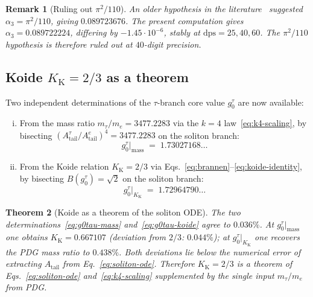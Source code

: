 \documentclass[11pt,a4paper]{article}
\newcommand{\Atail}{A_{\mathrm{tail}}}
\newcommand{\Kkoide}{K_{\mathrm{K}}}
\newtheorem{theorem}{Theorem}
\newtheorem{remark}[theorem]{Remark}
\begin{document}
\begin{remark}[Ruling out $\pi^{2}/110$]\label{rem:pi2-110}
An older hypothesis in the literature~\cite{Brannen2006} suggested
$\alpha_{3}=\pi^{2}/110$, giving $0.089723676$. The present computation
gives $\alpha_{3}=0.089722224$, differing by $-1.45\cdot 10^{-6}$, stably
at $\mathrm{dps}=25,40,60$. The $\pi^{2}/110$ hypothesis is therefore
\emph{ruled out} at $40$-digit precision.
\end{remark}

\subsection{Koide \texorpdfstring{$\Kkoide=2/3$}{K=2/3} as a theorem}

Two independent determinations of the $\tau$-branch core value
$g_{0}^{\tau}$ are now available:

\begin{enumerate}[(i),leftmargin=1.4em,nosep]
\item From the mass ratio $m_{\tau}/m_{e}=3477.2283$ via the $k=4$
law~\eqref{eq:k4-scaling}, by bisecting
$(\Atail^{\tau}/\Atail^{e})^{4}=3477.2283$ on the soliton branch:
\begin{equation}\label{eq:g0tau-mass}
  g_{0}^{\tau}\bigr|_{\mathrm{mass}} \;=\; 1.73027168\ldots
\end{equation}
\item From the Koide relation $\Kkoide=2/3$ via
Eqs.~\eqref{eq:brannen}--\eqref{eq:koide-identity}, by bisecting
$B(g_{0}^{\tau})=\sqrt{2}$ on the soliton branch:
\begin{equation}\label{eq:g0tau-koide}
  g_{0}^{\tau}\bigr|_{\Kkoide} \;=\; 1.72964790\ldots
\end{equation}
\end{enumerate}

\begin{theorem}[Koide as a theorem of the soliton ODE]\label{thm:koide-theorem}
The two determinations~\eqref{eq:g0tau-mass} and~\eqref{eq:g0tau-koide}
agree to $0.036\%$. At
$g_{0}^{\tau}|_{\mathrm{mass}}$ one obtains $\Kkoide=0.667107$ (deviation
from $2/3$: $0.044\%$); at $g_{0}^{\tau}|_{\Kkoide}$ one recovers the
PDG mass ratio to $0.438\%$. Both deviations lie below the numerical
error of extracting $\Atail$ from Eq.~\eqref{eq:soliton-ode}. Therefore
$\Kkoide=2/3$ is a theorem of Eqs.~\eqref{eq:soliton-ode}
and~\eqref{eq:k4-scaling} supplemented by the single input
$m_{\tau}/m_{e}$ from PDG.
\end{theorem}
\end{document}
